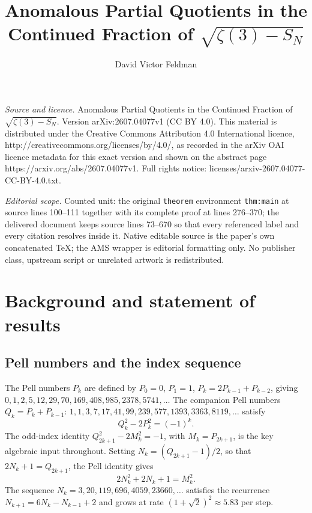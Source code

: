 \documentclass[10pt,a4paper]{amsart}
\begin{document}
\title[Anomalous Partial Quotients in the Continued Fraction of sqr]{Anomalous Partial Quotients in the Continued Fraction of $\sqrt{\zeta(3)-S_N}$}
\author{David Victor Feldman}
\date{}
\maketitle
\noindent\emph{Source and licence.} Anomalous Partial Quotients in the Continued Fraction of $\sqrt{\zeta(3)-S_N}$. Version arXiv:2607.04077v1 (CC BY 4.0). This material is distributed under the Creative Commons Attribution 4.0 International licence, http://creativecommons.org/licenses/by/4.0/, as recorded in the arXiv OAI licence metadata for this exact version and shown on the abstract page https://arxiv.org/abs/2607.04077v1. Full rights notice: licenses/arxiv-2607.04077-CC-BY-4.0.txt.\par\smallskip
\noindent\textit{Editorial scope.} Counted unit: the original \texttt{theorem} environment \texttt{thm:main} at source lines 100--111 together with its complete proof at lines 276--370; the delivered document keeps source lines 73--670 so that every referenced label and every citation resolves inside it. Native editable source is the paper's own concatenated TeX; the AMS wrapper is editorial formatting only. No publisher class, upstream script or unrelated artwork is redistributed.
\section{Background and statement of results}
\label{sec:intro}

\subsection{Pell numbers and the index sequence}

The Pell numbers $P_k$ are defined by $P_0=0$, $P_1=1$,
$P_k = 2P_{k-1}+P_{k-2}$, giving
$0, 1, 2, 5, 12, 29, 70, 169, 408, 985, 2378, 5741, \ldots$
The companion Pell numbers $Q_k = P_k + P_{k-1}$:
$1, 1, 3, 7, 17, 41, 99, 239, 577, 1393, 3363, 8119, \ldots$
satisfy
\begin{equation}\label{eq:pell}
  Q_k^2 - 2P_k^2 = (-1)^k.
\end{equation}
The odd-index identity $Q_{2k+1}^2 - 2M_k^2 = -1$, with $M_k = P_{2k+1}$,
is the key algebraic input throughout.  Setting $N_k = (Q_{2k+1}-1)/2$,
so that $2N_k + 1 = Q_{2k+1}$, the Pell identity gives
\begin{equation}\label{eq:pell-Nk}
  2N_k^2 + 2N_k + 1 = M_k^2.
\end{equation}
The sequence $N_k = 3, 20, 119, 696, 4059, 23660, \ldots$ satisfies
the recurrence $N_{k+1} = 6N_k - N_{k-1} + 2$ and grows at rate
$(1+\sqrt{2})^2 \approx 5.83$ per step.
\end{document}
